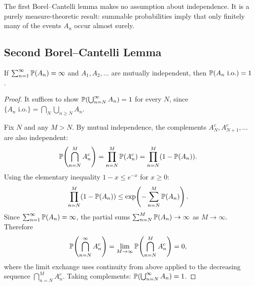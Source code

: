 \documentclass[11pt,a4paper]{article}
\begin{document}
\begin{remark}
\label{rem:bc1_no_indep}
The first Borel--Cantelli lemma makes no assumption about
independence.  It is a purely measure-theoretic result: summable
probabilities imply that only finitely many of the events $A_n$
occur almost surely.
\end{remark}

\subsection{Second Borel--Cantelli Lemma}
\label{subsec:bc2}

\begin{keyresult}[title={Second Borel--Cantelli Lemma}]
\begin{theorem}
\label{thm:bc2}
If $\sum_{n=1}^\infty \mathbb{P}(A_n) = \infty$ and
$A_1, A_2, \ldots$ are mutually independent, then
$\mathbb{P}(A_n \text{ i.o.}) = 1$.
\end{theorem}
\end{keyresult}

\begin{proof}
It suffices to show $\mathbb{P}(\bigcup_{n=N}^\infty A_n) = 1$ for
every $N$, since
$\{A_n \text{ i.o.}\} = \bigcap_N \bigcup_{n \geq N} A_n$.

Fix $N$ and any $M > N$.  By mutual independence, the complements
$A_N^c, A_{N+1}^c, \ldots$ are also independent:
\begin{equation}
  \mathbb{P}\!\left(\bigcap_{n=N}^M A_n^c\right)
  = \prod_{n=N}^M \mathbb{P}(A_n^c)
  = \prod_{n=N}^M (1 - \mathbb{P}(A_n)).
\end{equation}
Using the elementary inequality $1 - x \leq e^{-x}$ for
$x \geq 0$:
\begin{equation}
  \prod_{n=N}^M (1 - \mathbb{P}(A_n))
  \leq \exp\!\left(-\sum_{n=N}^M \mathbb{P}(A_n)\right).
\end{equation}
Since $\sum_{n=1}^\infty \mathbb{P}(A_n) = \infty$, the partial sums
$\sum_{n=N}^M \mathbb{P}(A_n) \to \infty$ as $M \to \infty$.
Therefore
\begin{equation}
  \mathbb{P}\!\left(\bigcap_{n=N}^\infty A_n^c\right)
  = \lim_{M \to \infty}
    \mathbb{P}\!\left(\bigcap_{n=N}^M A_n^c\right) = 0,
\end{equation}
where the limit exchange uses continuity from above applied to
the decreasing sequence $\bigcap_{n=N}^M A_n^c$.  Taking
complements: $\mathbb{P}(\bigcup_{n=N}^\infty A_n) = 1$.
\end{proof}
\end{document}

